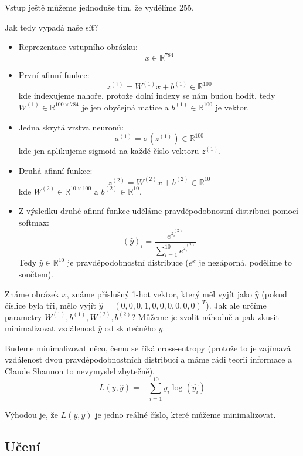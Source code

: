 Vstup ještě můžeme  jednoduše tím, že vydělíme 255.

Jak tedy vypadá naše síť?

\begin{itemize}

  \item  Reprezentace vstupního obrázku:
    $$x \in \mathbb{R}^{784}$$

  \item  První afinní funkce:
    $$z^{(1)} = W^{(1)} x + b^{(1)} \in \mathbb{R}^{100}$$
    kde indexujeme nahoře, protože dolní indexy se nám budou hodit, tedy $W^{(1)} \in \mathbb{R}^{100 \times 784}$ je jen obyčejná matice a $b^{(1)} \in \mathbb{R}^{100}$ je vektor.

  \item  Jedna skrytá vrstva neuronů:
    $$a^{(1)} = \sigma(z^{(1)}) \in \mathbb{R}^{100}$$
    kde jen aplikujeme sigmoid na každé číslo vektoru $z^{(1)}$.

  \item  Druhá afinní funkce:
    $$z^{(2)} = W^{(2)} x + b^{(2)} \in \mathbb{R}^{10}$$
    kde $W^{(2)} \in \mathbb{R}^{10 \times 100}$ a $b^{(2)} \in \mathbb{R}^{10}$.

  \item  Z výsledku druhé afinní funkce uděláme pravděpodobnostní distribuci pomocí softmax:
    $$(\hat{y})_i = \frac{e^{z^{(2)}_i}}{ \sum_{i=1}^{10} e^{z^{(2)}_i} }$$
    Tedy $\hat{y} \in \mathbb{R}^{10}$ je pravděpodobnostní distribuce ($e^x$ je nezáporná, podělíme to součtem).

\end{itemize}

Známe obrázek $x$, známe příslušný 1-hot vektor, který měl vyjít jako $\hat{y}$ (pokud číslice byla tři, mělo vyjít $\hat{y} = (0, 0, 0, 1, 0, 0, 0, 0, 0, 0)^T$).
Jak ale určíme parametry $W^{(1)}, b^{(1)}, W^{(2)}, b^{(2)}$?
Můžeme je zvolit náhodně a pak zkusit minimalizovat vzdálenost $\hat{y}$ od skutečného $y$.

Budeme minimalizovat něco, čemu se říká cross-entropy (protože to je zajímavá vzdálenost dvou pravděpodobnostních distribucí a máme rádi teorii informace a Claude Shannon to nevymyslel zbytečně).
$$L(y, \hat{y}) = -\sum_{i = 1}^{10} y_i \log(\hat{y_i})$$

Výhodou je, že $L(y, \hat{y})$ je jedno reálné číslo, které můžeme minimalizovat.

\subsection{Učení}

